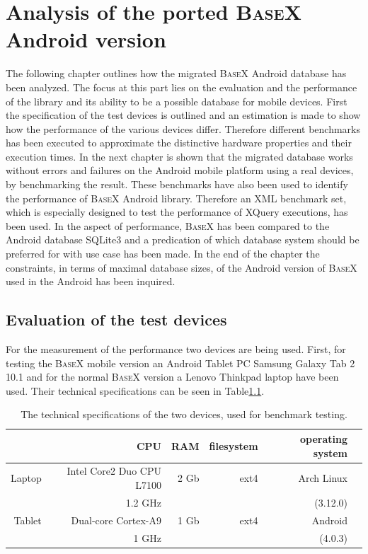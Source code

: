 \chapter{Analysis of the ported \textsc{BaseX} Android version}
\label{cha:analysis}
The following chapter outlines how the migrated \textsc{BaseX} Android database has been analyzed.
The focus at this part lies on the evaluation and the performance of the library and its ability to be a possible database for mobile devices.
First the specification of the test devices is outlined and an estimation is made to show how the performance of the various devices differ.
Therefore different benchmarks has been executed to approximate the distinctive hardware properties and their execution times.
In the next chapter is shown that the migrated database works without errors and failures on the Android mobile platform using a real devices, by benchmarking the result.
These benchmarks have also been used to identify the performance of \textsc{BaseX} Android library. 
Therefore an XML benchmark set, which is especially designed to test the performance of XQuery executions, has been used.
In the aspect of performance, \textsc{BaseX} has been compared to the Android database SQLite3 and a predication of which database system should be preferred for with use case has been made.
In the end of the chapter the constraints, in terms of maximal database sizes, of the Android version of \textsc{BaseX} used in the Android has been inquired.

\section{Evaluation of the test devices}
\label{sec:evaluation-of-the-test-devices}
For the measurement of the performance two devices are being used.
First, for testing the \textsc{BaseX} mobile version an Android Tablet PC Samsung Galaxy Tab 2 10.1 and for the normal \textsc{BaseX} version a Lenovo Thinkpad laptop have been used.
Their technical specifications can be seen in Table\ref{tab:test-dev-specs}.
\begin {table}[htpb] 
  \centering
\begin {tabular} {|r|r|r|r|r|r|}
  	\hline
	&CPU&RAM&filesystem&operating system\\
	\hline
	Laptop&Intel Core2 Duo CPU L7100&2 Gb&ext4&Arch Linux\\
	&1.2 GHz&&&(3.12.0)\\
	\hline
	Tablet&Dual-core Cortex-A9&1 Gb&ext4&Android\\
	&1 GHz&&&(4.0.3)\\
	\hline
\end {tabular}
\caption {The technical specifications of the two devices, used for benchmark testing.}
\label {tab:test-dev-specs}
\end {table}

